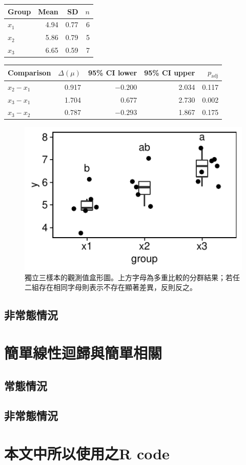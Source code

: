 \documentclass[12pt, a4paper, onecolumn]{article}
\begin{document}
\begin{table}
	\centering
	\begin{tabular}{lrrr}
		\hline
		Group & Mean & SD & $n$\\ 
		\hline
		$x_1$ & 4.94 & 0.77 &   6 \\ 
		$x_2$ & 5.86 & 0.79 &   5 \\ 
		$x_3$ & 6.65 & 0.59 &   7 \\ 
		\hline
	\end{tabular}
	\label{table:oneway_ANOVA}
\end{table}

\begin{table}
	\centering
	\begin{tabular}{lrrrr}
		\hline
		Comparison & $\Delta(\mu)$ & 95\% CI lower & 95\% CI upper & $p_{\mathrm{adj}}$ \\ 
		\hline
		$x_2-x_1$ & 0.917 & $-0.200$ & 2.034 & 0.117 \\ 
		$x_3-x_1$ & 1.704 & 0.677 & 2.730 & 0.002 \\ 
		$x_3-x_2$ & 0.787 & $-0.293$ & 1.867 & 0.175 \\ 
		\hline
	\end{tabular}
	\label{table:oneway_ANOVA_post}
\end{table}

\begin{figure}
	\centering
	\includegraphics[]{oneway_ANOVA.pdf}
	\caption{獨立三樣本的觀測值盒形圖。上方字母為多重比較的分群結果；若任二組存在相同字母則表示不存在顯著差異，反則反之。}
	\label{fig:oneway_ANOVA}
\end{figure}

\subsection{非常態情況}

\section{簡單線性迴歸與簡單相關}
\subsection{常態情況}
\subsection{非常態情況}


\clearpage
\appendix
\section{本文中所以使用之R code}
\end{document}
